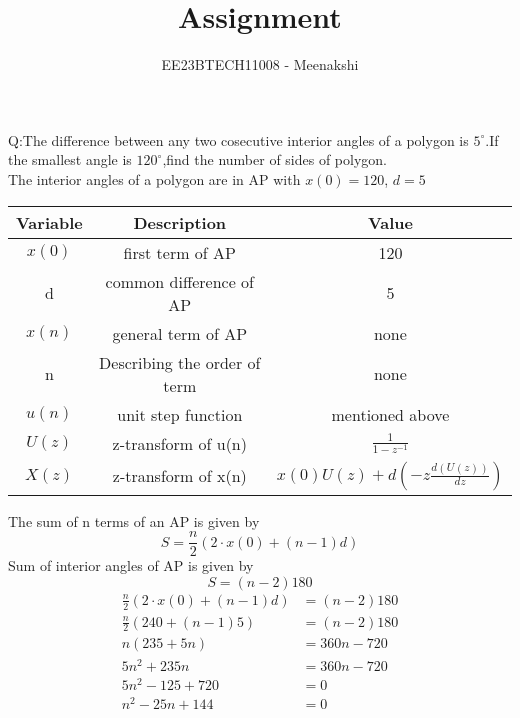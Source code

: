 \documentclass[journal,12pt,twocolumn]{IEEEtran}
\theoremstyle{remark}
\begin{document}
\let\vec\mathbf



\vspace{3cm}
\title{Assignment}
\author{EE23BTECH11008 - Meenakshi}
\maketitle
\newpage
\bigskip

\renewcommand{\thefigure}{\theenumi}
\renewcommand{\thetable}{\theenumi}
Q:The difference between any two cosecutive interior angles of a polygon is $5^\circ$.If the smallest angle is $120^\circ$,find the number of sides of polygon.
\\\solution
The interior angles of a polygon are in AP with
    $x(0)=120$, $d=5$
\begin{table}[ht]
  \centering
  \begin{tabular}{|c|c|c|}
    \hline
      \textbf{Variable}& \textbf{Description}& \textbf{Value}\\\hline
    $x(0)$& first term of AP& 120  \\\hline
    d& common difference of AP & 5\\\hline
    $x(n)$ & general  term of AP&none\\\hline
   n & Describing the order of term & none\\\hline
    $u(n)$& unit step function & mentioned above\\\hline
    $U(z) $& z-transform of u(n) & $\frac{1}{1-z^{-1}}$\\\hline
    $X(z)$& z-transform of x(n) & $x(0)U(z)+d\left(-z\frac{d(U(z))}{dz}\right)$\\ 
    \hline
  \end{tabular}
  \end {table}
The sum of n terms of an AP is given by
\begin{equation}
    S=\frac{n}{2}(2\cdot x(0)+(n-1)d)
\end{equation}
Sum of interior angles of AP is given by
\begin{equation}
    S=(n-2)180
\end{equation}
\begin{align}
\frac{n}{2}(2\cdot x(0)+(n-1)d)&= (n-2)180\\
    \frac{n}{2}(240+(n-1)5)&=(n-2)180\\
    n(235+5n)&=360n-720\\
    5n^2+235n&=360n-720\\
    5n^2-125+720&=0\\
    n^2-25n+144&=0
\end{align}
\end{document}

